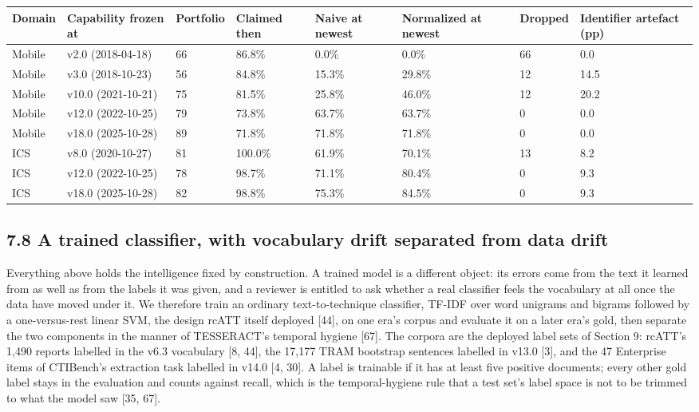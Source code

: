 \documentclass[11pt,a4paper]{article}
\begin{document}
\begin{center}\footnotesize
\begin{tabular}{llllllll}
\toprule
Domain & Capability frozen at & Portfolio & Claimed then & Naive at newest & Normalized at newest & Dropped & Identifier artefact (pp) \\
\midrule
Mobile & v2.0 (2018-04-18) & 66 & 86.8\% & 0.0\% & 0.0\% & 66 & 0.0 \\
Mobile & v3.0 (2018-10-23) & 56 & 84.8\% & 15.3\% & 29.8\% & 12 & 14.5 \\
Mobile & v10.0 (2021-10-21) & 75 & 81.5\% & 25.8\% & 46.0\% & 12 & 20.2 \\
Mobile & v12.0 (2022-10-25) & 79 & 73.8\% & 63.7\% & 63.7\% & 0 & 0.0 \\
Mobile & v18.0 (2025-10-28) & 89 & 71.8\% & 71.8\% & 71.8\% & 0 & 0.0 \\
ICS & v8.0 (2020-10-27) & 81 & 100.0\% & 61.9\% & 70.1\% & 13 & 8.2 \\
ICS & v12.0 (2022-10-25) & 78 & 98.7\% & 71.1\% & 80.4\% & 0 & 9.3 \\
ICS & v18.0 (2025-10-28) & 82 & 98.8\% & 75.3\% & 84.5\% & 0 & 9.3 \\
\bottomrule
\end{tabular}
\end{center}

\subsection{7.8 A trained classifier, with vocabulary drift separated from data drift}

Everything above holds the intelligence fixed by construction. A trained model is a different object: its errors come from the text it learned from as well as from the labels it was given, and a reviewer is entitled to ask whether a real classifier feels the vocabulary at all once the data have moved under it. We therefore train an ordinary text-to-technique classifier, TF-IDF over word unigrams and bigrams followed by a one-versus-rest linear SVM, the design rcATT itself deployed [44], on one era's corpus and evaluate it on a later era's gold, then separate the two components in the manner of TESSERACT's temporal hygiene [67]. The corpora are the deployed label sets of Section 9: rcATT's 1,490 reports labelled in the v6.3 vocabulary [8, 44], the 17,177 TRAM bootstrap sentences labelled in v13.0 [3], and the 47 Enterprise items of CTIBench's extraction task labelled in v14.0 [4, 30]. A label is trainable if it has at least five positive documents; every other gold label stays in the evaluation and counts against recall, which is the temporal-hygiene rule that a test set's label space is not to be trimmed to what the model saw [35, 67].
\end{document}
